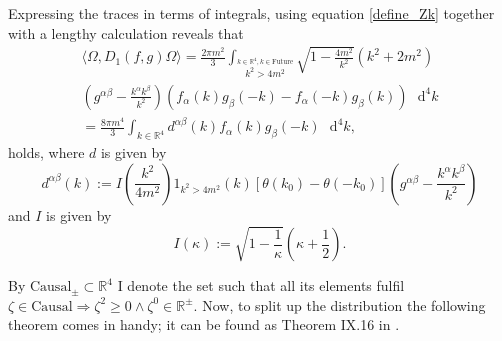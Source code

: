 \documentclass[b5paper,draft,openbib,12pt]{memoir}
\begin{document}
Expressing the traces in terms of integrals, using equation \eqref{define_Zk} together with a lengthy calculation reveals that 
\begin{equation}
\begin{aligned}
\langle \Omega, D_1(f,g) \Omega \rangle
=\frac{2\pi m^2}{3} \int_{\stackrel{k\in\mathbb{R}^4, k\in\text{Future}}{k^2>4m^2}} \sqrt{1-\frac{4m^2}{k^2}}(k^2+2m^2) \\
(g^{\alpha \beta}-\frac{k^\alpha k^\beta}{k^2})\left(f_\alpha (k) g_\beta (-k) - f_\alpha (-k) g_\beta (k)\right) \text{ }\mathrm{d}^4k\\
=\frac{8 \pi m^4}{3} \int_{k\in\mathbb{R}^4}  d^{\alpha \beta}(k) f_\alpha(k) g_\beta (-k)\text{ }\mathrm{d}^4k,
\end{aligned}
\end{equation}
holds, where \(d\) is given by
\begin{equation}
d^{\alpha \beta}(k):= I\left( \frac{k^2}{4m^2}\right) 1_{k^2>4m^2}(k) [\theta (k_0)- \theta (-k_0)] \left(g^{\alpha \beta}-\frac{k^\alpha k^\beta}{k^2}\right)
\end{equation}
and \(I\) is given by
\begin{equation}
I(\kappa):=\sqrt{1-\frac{1}{\kappa}}\left(\kappa +\frac{1}{2}\right).
\end{equation}

By \(\text{Causal}_{\pm}\subset \mathbb{R}^4\) I denote the set such that all its elements fulfil \(\zeta\in \text{Causal} \Rightarrow \zeta^2\ge 0\wedge \zeta^0 \in \mathbb{R}^{\pm}\).
Now, to split up the distribution the following theorem comes in handy; it can be found as Theorem IX.16 in \cite{reed1975methods}.
\end{document}
